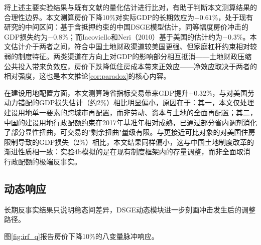 \documentclass[UTF8,a4paper,12pt]{ctexart}
\theoremstyle{plain}
\theoremstyle{definition}
\theoremstyle{remark}
\begin{document}
将上述主要实验结果与既有文献的量化估计进行比对，有助于判断本文测算结果的合理性边界。本文测算房价下降10\%对实际GDP的长期效应为$-0.61\%$，处于现有研究的中间区间：\citet{liuetal2013}基于含抵押约束的中国DSGE模型估计，同等幅度房价冲击的GDP损失约为$-0.8\%$；而Iacoviello和Neri（2010）基于美国的估计约为$-0.3\%$。本文估计介于两者之间，符合中国土地财政渠道较美国更强、但家庭杠杆约束相对较弱的制度特征。两类渠道在方向上对GDP的影响部分相互抵消——土地财政压缩公共投入带来负效应，房价下跌降低住房成本带来正效应——净效应取决于两者的相对强度，这也是本文推论\ref{cor:paradox}的核心内容。

在建设用地配置方面，本文测算跨省指标交易带来GDP提升$+0.32\%$，与\citet{fajgelbaum2019}对美国劳动力错配的GDP损失估计（约2\%）相比明显偏小，原因在于：其一，本文仅处理建设用地单一要素的跨城市再配置，而非劳动、资本与土地的全面再配置；其二，中国的建设用地行政配额约束在2017年基准年相对成熟，已通过部分省内调剂消化了部分显性扭曲，可交易的"剩余扭曲"量级有限。与更接近可比对象的\citet{hsiehmoretti2019}对美国住房限制导致的GDP损失（2\%）相比，本文结果同样偏小，这与中国土地制度改革的渐进性质相一致：实验4b模拟的是在现有制度框架内的存量调整，而非全面取消行政配额的极端反事实。

\subsection{动态响应}

长期反事实结果只说明稳态间差异，DSGE动态模块进一步刻画冲击发生后的调整路径。

图\ref{fig:irf_q}报告房价下降10\%的八变量脉冲响应。
\end{document}
